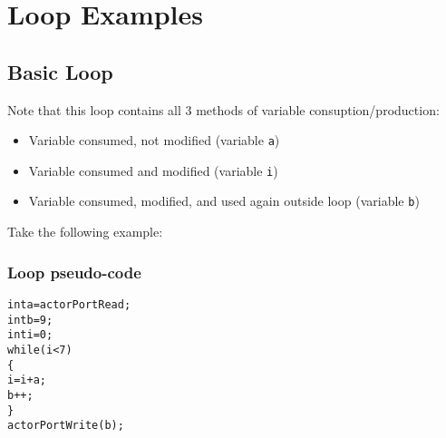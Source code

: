 \chapter{Loop Examples}

\section{Basic Loop}

Note that this loop contains all 3 methods of variable consuption/production:\\
\begin{itemize}
\item Variable consumed, not modified (variable {\tt a})
\item Variable consumed and modified (variable {\tt i})
\item Variable consumed, modified, and used again outside loop (variable {\tt b})
\end{itemize}

Take the following example:
\subsection{Loop pseudo-code}
\begin{alltt}
int a = actorPortRead;
int b = 9;
int i = 0;
while ( i < 7 )
\{
  i = i + a;
  b++;
\}
actorPortWrite(b);
\end{alltt}

